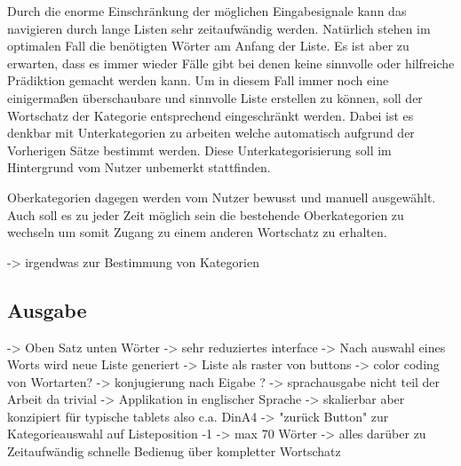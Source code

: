         Durch die enorme Einschränkung der möglichen Eingabesignale kann das navigieren durch lange Listen sehr zeitaufwändig werden. Natürlich stehen im optimalen Fall die benötigten Wörter am Anfang der Liste. Es ist aber zu erwarten, dass es immer wieder Fälle gibt bei denen keine sinnvolle oder hilfreiche Prädiktion gemacht werden kann. Um in diesem Fall immer noch eine einigermaßen überschaubare und sinnvolle Liste erstellen zu können, soll der Wortschatz der Kategorie entsprechend eingeschränkt werden. Dabei ist es denkbar mit Unterkategorien zu arbeiten welche automatisch aufgrund der Vorherigen Sätze bestimmt werden. Diese Unterkategorisierung soll im Hintergrund vom Nutzer unbemerkt stattfinden.
        
        Oberkategorien dagegen werden vom Nutzer bewusst und manuell ausgewählt. Auch soll es zu jeder Zeit möglich sein die bestehende Oberkategorien zu wechseln um somit Zugang zu einem anderen Wortschatz zu erhalten.
        
        -> irgendwas zur Bestimmung von Kategorien
        \newpage
        
        
       	\subsection{Ausgabe}
        
        -> Oben Satz unten Wörter
        -> sehr reduziertes interface
        -> Nach auswahl eines Worts wird neue Liste generiert
        -> Liste als raster von buttons
        -> color coding von Wortarten?
        -> konjugierung nach Eigabe ?
        -> sprachausgabe nicht teil der Arbeit da trivial
        -> Applikation in englischer Sprache
        -> skalierbar aber konzipiert für typische tablets
           also c.a. DinA4
        -> "zurück Button" zur Kategorieauswahl auf Listeposition -1
        -> max 70 Wörter -> alles darüber zu Zeitaufwändig schnelle  
           Bedienug über kompletter Wortschatz
    
    
    
    
    
    
    
    
    
    
    
    
    
    
    
    
    
    
    
    